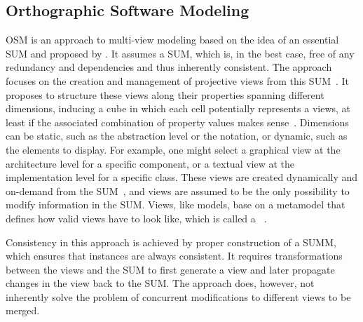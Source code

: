 




\subsection{Orthographic Software Modeling}
\label{chap:foundations:multiview:osm}

\gls{OSM} is an approach to multi-view modeling based on the idea of an essential \gls{SUM} and proposed by \textcite{atkinson2010a}.
It assumes a \gls{SUM}, which is, in the best case, free of any redundancy and dependencies and thus inherently consistent.
The approach focuses on the creation and management of projective views from this \gls{SUM}~\cite[p.~211]{atkinson2010a}.
It proposes to structure these views along their properties spanning different dimensions, inducing a cube in which each cell potentially represents a views, at least if the associated combination of property values makes sense~\cite[p.~212]{atkinson2010a}.
Dimensions can be static, such as the abstraction level or the notation, or dynamic, such as the elements to display.
For example, one might select a graphical view at the architecture level for a specific component, or a textual view at the implementation level for a specific class.
These views are created dynamically and on-demand from the \gls{SUM}~\cite[p.~211]{atkinson2010a}, and views are assumed to be the only possibility to modify information in the \gls{SUM}.
Views, like models, base on a metamodel that defines how valid views have to look like, which is called a \emph{\viewtype}~\cite[p.~133]{goldschmidt2011diss}.

Consistency in this approach is achieved by proper construction of a \gls{SUMM}, which ensures that instances are always consistent.
It requires transformations between the views and the \gls{SUM} to first generate a view and later propagate changes in the view back to the \gls{SUM}.
The approach does, however, not inherently solve the problem of concurrent modifications to different views to be merged.


